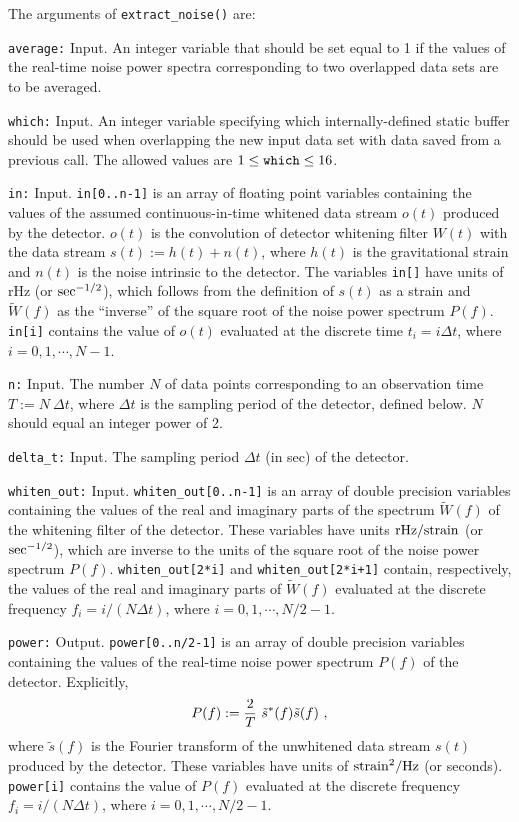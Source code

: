 The arguments of {\tt extract\_noise()} are:
\begin{description}
%
\item{\tt average:} Input.
An integer variable that should be set equal to 1 if the values 
of the real-time noise power spectra corresponding to two overlapped 
data sets are to be averaged.
%
\item{\tt which:} Input.
An integer variable specifying which internally-defined static
buffer should be used when overlapping the new input data set with data 
saved from a previous call.
The allowed values are $1\le{\tt which}\le 16$.
\item{\tt in:} Input.  
{\tt in[0..n-1]} is an array of floating point variables containing
the values of the assumed continuous-in-time whitened data stream 
$o(t)$ produced by the detector.
$o(t)$ is the convolution of detector whitening filter $W(t)$
with the data stream $s(t):=h(t)+n(t)$, where $h(t)$ is the 
gravitational strain and $n(t)$ is the noise intrinsic to the
detector.
The variables {\tt in[]} have units of rHz (or ${\rm sec}^{-1/2}$),
which follows from the definition of $s(t)$ as a strain and
$\tilde W(f)$ as the ``inverse'' of the square root 
of the noise power spectrum $P(f)$.
{\tt in[i]} contains the value of $o(t)$ evaluated at the discrete 
time $t_i=i\Delta t$, where $i=0,1,\cdots,N-1$.
%
\item{\tt n:} Input. 
The number $N$ of data points corresponding to an observation
time $T:=N\ \Delta t$, where
$\Delta t$ is the sampling period of the detector, defined below.
$N$ should equal an integer power of 2.
%
\item{\tt delta\_t:} Input.  
The sampling period $\Delta t$ (in sec) of the detector. 
%
\item{\tt whiten\_out:} Input.
{\tt whiten\_out[0..n-1]} is an array of double precision variables 
containing the values of the real and imaginary parts of the spectrum 
$\tilde W(f)$ of the whitening filter of the detector.
These variables have units ${\rm rHz}/{\rm strain}$ 
(or ${\rm sec}^{-1/2}$), which are inverse to the units of the square 
root of the noise power spectrum $P(f)$.
{\tt whiten\_out[2*i]} and {\tt whiten\_out[2*i+1]} contain, respectively, 
the values of the real and imaginary parts of $\tilde W(f)$
evaluated at the discrete frequency $f_i=i/(N\Delta t)$, where 
$i=0,1,\cdots,N/2-1$.
%
\item{\tt power:} Output.  
{\tt power[0..n/2-1]} is an array of double precision variables 
containing the values of the real-time noise power spectrum $P(f)$ 
of the detector.
Explicitly,
%
\begin{equation}
P(f):={2\over T}\ \tilde s^*(f)\tilde s(f)\ ,
\end{equation}
%
where $\tilde s(f)$ is the Fourier transform of the unwhitened
data stream $s(t)$ produced by the detector.
These variables have units of ${\rm strain}^2/{\rm Hz}$ (or seconds).
{\tt power[i]} contains the value of $P(f)$ evaluated at the discrete
frequency $f_i=i/(N\Delta t)$, where $i=0,1,\cdots,N/2-1$.
\end{description}

